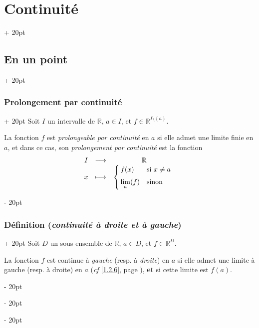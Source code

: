 \documentclass[a4paper, 12pt, twoside]{article}
\newcommand{\R}{\mathbb{R}} %
\newcommand{\set}[1]{\left\{ #1 \right\}}
\newcommand{\ind}[1][20pt]{\advance\leftskip + #1}
\newcommand{\deind}[1][20pt]{\advance\leftskip - #1}
\newenvironment{indt}[2][20pt]{#2 \par \ind[#1]}{\par \deind} %
\begin{document}
\begin{indt}{\section{Continuité}}
\begin{indt}{\subsection{En un point}}
            \vspace{12pt}
            
            \begin{indt}{\subsubsection{Prolongement par continuité}}
                Soit $I$ un intervalle de $\R$, $a \in I$, et $f \in \R^{I \setminus \set a}$.

                La fonction $f$ est \textit{prolongeable par continuité} en $a$ si elle admet une limite finie en $a$, et dans ce cas, son \textit{prolongement par continuité} est la fonction
                \[
                    \begin{array}{ccc}
                        I & \longrightarrow & \R
                        \\
                        x & \longmapsto &
                        \left\{\!\!
                        \begin{array}{ll}
                            f(x) & \text{si}\ x \neq a
                            \vspace{6pt}
                            \\
                            \displaystyle \lim_a(f) & \text{sinon}
                        \end{array}
                        \right.
                    \end{array}
                \]
            \end{indt}

            \vspace{12pt}
            
            \begin{indt}{\subsubsection{Définition (\textit{continuité à droite et à gauche})}}
                Soit $D$ un sous-ensemble de $\R$, $a \in D$, et $f \in \R^D$.

                La fonction $f$ est continue à \textit{gauche} (resp. à \textit{droite}) en $a$ si elle admet une limite à gauche (resp. à droite) en $a$ (\textit{cf} \ref{1.2.6}, page \pageref{1.2.6}), \textbf{et} si cette limite est $f(a)$.
            \end{indt}


\end{indt}
\end{indt}
\end{document}
